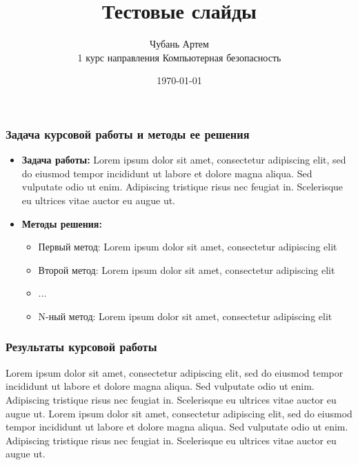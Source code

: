 \documentclass{beamer}
\title{Тестовые слайды}
\author{Чубань Артем\\
1 курс направления Компьютерная безопасность}
\institute{Балтийский Федеральный Университет имени Иманила Канта}
\date{\today}
\begin{document}
	\begin{frame}
		\titlepage
	\end{frame}

	\begin{frame}
		\frametitle{Задача курсовой работы и методы ее решения}
		\begin{itemize}
			\item \textbf{Задача работы:} Lorem ipsum dolor sit amet, consectetur adipiscing elit, sed do eiusmod tempor incididunt ut labore et dolore magna aliqua. Sed vulputate odio ut enim. Adipiscing tristique risus nec feugiat in. Scelerisque eu ultrices vitae auctor eu augue ut.
			\item \textbf{Методы решения:}
				\begin{itemize}
					\item Первый метод: Lorem ipsum dolor sit amet, consectetur adipiscing elit
					\item Второй метод: Lorem ipsum dolor sit amet, consectetur adipiscing elit
					\item ...
					\item N-ный метод: Lorem ipsum dolor sit amet, consectetur adipiscing elit
				\end{itemize}
		\end{itemize}
	\end{frame}
	
	\begin{frame}
		\frametitle{Результаты курсовой работы}
		Lorem ipsum dolor sit amet, consectetur adipiscing elit, sed do eiusmod tempor incididunt ut labore et dolore magna aliqua. Sed vulputate odio ut enim. Adipiscing tristique risus nec feugiat in. Scelerisque eu ultrices vitae auctor eu augue ut. Lorem ipsum dolor sit amet, consectetur adipiscing elit, sed do eiusmod tempor incididunt ut labore et dolore magna aliqua. Sed vulputate odio ut enim. Adipiscing tristique risus nec feugiat in. Scelerisque eu ultrices vitae auctor eu augue ut.
	\end{frame}
		
	
\end{document}

